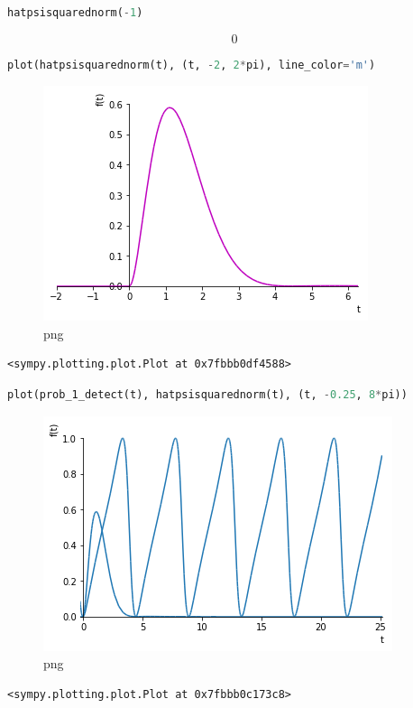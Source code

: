 \begin{lstlisting}[language=Python]
hatpsisquarednorm(-1)
\end{lstlisting}

\[0\]

\begin{lstlisting}[language=Python]
plot(hatpsisquarednorm(t), (t, -2, 2*pi), line_color='m')
\end{lstlisting}

\begin{figure}
\centering
\includegraphics[width=0.66\linewidth]{output_49_0.png}
\caption{png}
\end{figure}

\begin{lstlisting}
<sympy.plotting.plot.Plot at 0x7fbbb0df4588>
\end{lstlisting}

\begin{lstlisting}[language=Python]
plot(prob_1_detect(t), hatpsisquarednorm(t), (t, -0.25, 8*pi))
\end{lstlisting}

\begin{figure}
\centering
\includegraphics[width=0.66\linewidth]{output_50_0.png}
\caption{png}
\end{figure}

\begin{lstlisting}
<sympy.plotting.plot.Plot at 0x7fbbb0c173c8>
\end{lstlisting}


